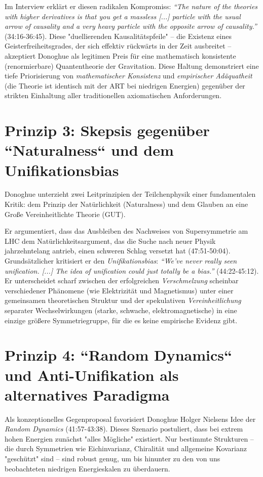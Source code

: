 	Im Interview erklärt er diesen radikalen Kompromiss: \emph{``The nature of the theories with higher derivatives is that you get a massless [...] particle with the usual arrow of causality and a very heavy particle with the opposite arrow of causality.''} \cite{DonoghueInterview2025} (34:16-36:45). Diese "duellierenden Kausalitätspfeile" – die Existenz eines Geisterfreiheitsgrades, der sich effektiv rückwärts in der Zeit ausbreitet – akzeptiert Donoghue als legitimen Preis für eine mathematisch konsistente (renormierbare) Quantentheorie der Gravitation. Diese Haltung demonstriert eine tiefe Priorisierung von \emph{mathematischer Konsistenz} und \emph{empirischer Adäquatheit} (die Theorie ist identisch mit der ART bei niedrigen Energien) gegenüber der strikten Einhaltung aller traditionellen axiomatischen Anforderungen.
	
	\section{Prinzip 3: Skepsis gegenüber ``Naturalness`` und dem Unifikationsbias}
	
	Donoghue unterzieht zwei Leitprinzipien der Teilchenphysik einer fundamentalen Kritik: dem Prinzip der Natürlichkeit (Naturalness) und dem Glauben an eine Große Vereinheitlichte Theorie (GUT).
	
	Er argumentiert, dass das Ausbleiben des Nachweises von Supersymmetrie am LHC dem Natürlichkeitsargument, das die Suche nach neuer Physik jahrzehntelang antrieb, einen schweren Schlag versetzt hat \cite{DonoghueInterview2025} (47:51-50:04). Grundsätzlicher kritisiert er den \emph{Unifikationsbias}: \emph{``We've never really seen unification. [...] The idea of unification could just totally be a bias.''} \cite{DonoghueInterview2025} (44:22-45:12). Er unterscheidet scharf zwischen der erfolgreichen \emph{Verschmelzung} scheinbar verschiedener Phänomene (wie Elektrizität und Magnetismus) unter einer gemeinsamen theoretischen Struktur und der spekulativen \emph{Vereinheitlichung} separater Wechselwirkungen (starke, schwache, elektromagnetische) in eine einzige größere Symmetriegruppe, für die es keine empirische Evidenz gibt.
	
	\section{Prinzip 4: ``Random Dynamics`` und Anti-Unifikation als alternatives Paradigma}
	
	Als konzeptionelles Gegenproposal favorisiert Donoghue Holger Nielsens Idee der \emph{Random Dynamics} \cite{DonoghueInterview2025} (41:57-43:38). Dieses Szenario postuliert, dass bei extrem hohen Energien zunächst "alles Mögliche" existiert. Nur bestimmte Strukturen – die durch Symmetrien wie Eichinvarianz, Chiralität und allgemeine Kovarianz "geschützt" sind – sind robust genug, um bis hinunter zu den von uns beobachteten niedrigen Energieskalen zu überdauern.
	
